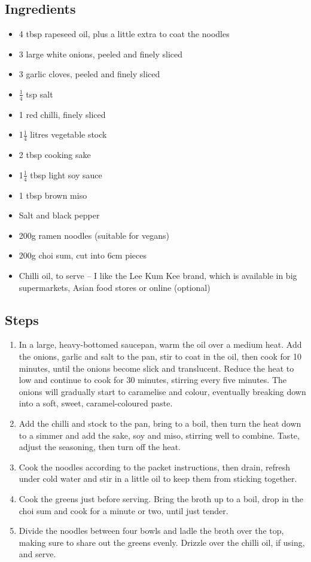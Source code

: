 \documentclass{book}
\begin{document}
\subsection*{Ingredients}
\begin{itemize}
\item 4 tbsp rapeseed oil, plus a little extra to coat the noodles
\item 3 large white onions, peeled and finely sliced
\item 3 garlic cloves, peeled and finely sliced
\item $\frac{1}{4}$ tsp salt
\item 1 red chilli, finely sliced
\item 1$\frac{1}{4}$ litres vegetable stock
\item 2 tbsp cooking sake
\item 1$\frac{1}{4}$ tbsp light soy sauce
\item 1 tbsp brown miso
\item Salt and black pepper
\item 200g ramen noodles (suitable for vegans)
\item 200g choi sum, cut into 6cm pieces
\item Chilli oil, to serve – I like the Lee Kum Kee brand, which is available in big supermarkets, Asian food stores or online (optional)
\end{itemize}

\subsection*{Steps}
\begin{enumerate}
\item In a large, heavy-bottomed saucepan, warm the oil over a medium heat. Add the onions, garlic and salt to the pan, stir to coat in the oil, then cook for 10 minutes, until the onions become slick and translucent. Reduce the heat to low and continue to cook for 30 minutes, stirring every five minutes. The onions will gradually start to caramelise and colour, eventually breaking down into a soft, sweet, caramel-coloured paste.
\item Add the chilli and stock to the pan, bring to a boil, then turn the heat down to a simmer and add the sake, soy and miso, stirring well to combine. Taste, adjust the seasoning, then turn off the heat.
\item Cook the noodles according to the packet instructions, then drain, refresh under cold water and stir in a little oil to keep them from sticking together.
\item Cook the greens just before serving. Bring the broth up to a boil, drop in the choi sum and cook for a minute or two, until just tender.
\item Divide the noodles between four bowls and ladle the broth over the top, making sure to share out the greens evenly. Drizzle over the chilli oil, if using, and serve.
\end{enumerate}
\newpage
\end{document}

